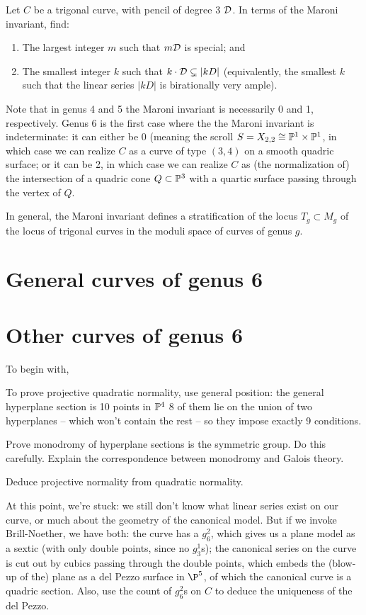 \begin{exercise}
Let $C$ be a trigonal curve, with pencil of degree 3 ${\cal D}$. In terms of the Maroni invariant, find:
\begin{enumerate}
\item The largest integer $m$ such that $m{\cal D}$ is special; and
\item The smallest integer $k$ such that $k\cdot {\cal D} \subsetneq |kD|$ (equivalently, the smallest $k$ such that the linear series $|kD|$ is birationally very ample).
\end{enumerate}
\end{exercise}

Note that in genus 4 and 5 the Maroni invariant is necessarily 0 and 1, respectively. Genus 6 is the first case where the the Maroni invariant is indeterminate: it can either be 0 (meaning the scroll $S = X_{2,2} \cong {\mathbb P}^1 \times {\mathbb P}^1$, in which case we can realize $C$ as a curve of type $(3,4)$ on a smooth quadric surface; or it can be 2, in which case we can realize $C$ as (the normalization of) the intersection of a quadric cone $Q \subset {\mathbb P}^3$ with a quartic surface passing through the vertex of $Q$.

In general, the Maroni invariant defines a stratification of the locus $T_g \subset M_g$ of the locus of trigonal curves in the moduli space of curves of genus $g$.

\section{General curves of genus 6}

\section{Other curves of genus 6}


To begin with,

To prove projective quadratic normality,  use general position: the general hyperplane section is 10 points in ${\mathbb P}^4$ 8 of them lie on the union of two hyperplanes -- which won't contain the rest -- so they impose exactly 9 conditions. 

Prove monodromy of hyperplane sections is the symmetric group. Do this carefully. Explain the correspondence between monodromy and Galois theory. 

Deduce projective normality from quadratic normality.

At this point, we're stuck: we still don't know what linear series exist on our curve, or much about the geometry of the canonical model. But if we invoke Brill-Noether, we have both: the curve has a $g^2_6$, which gives us a plane model as a sextic (with only double points, since no $g^1_3$s); the canonical series on the curve is cut out by cubics passing through the double points, which embeds the (blow-up of the) plane as a del Pezzo surface in $\P^5$, of which the canonical curve is a quadric section. Also, use the count of $g^2_6$s on $C$ to deduce the uniqueness of the del Pezzo.




